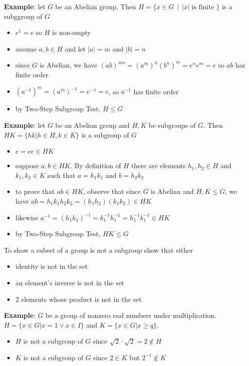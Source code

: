 \documentclass{article}
\begin{document}
  \textbf{Example}: let $G$ be an Abelian group. Then $H = \{x \in G \, \mid \, |x| \text{ is finite }\}$ is a subggroup of $G$
  \begin{itemize}
    \item $e^1 = e$ so $H$ is non-empty
    \item assume $a, b \in H$ and let $|a| = m$ and $|b| = n$
    \item since $G$ is Abelian, we have $(ab)^{mn} = (a^m)^n(b^n)^m = e^ne^m = e$ so $ab$ has finite order
    \item $(a^{-1})^m = (a^m)^{-1} = e^{-1} = e$, so $a^{-1}$ has finite order
    \item by Two-Step Subgroup Test, $H \leq G$
  \end{itemize}
  \textbf{Example}: let $G$ be an Abelian group and $H, K$ be subgroups of $G$. Then $HK = \{hk | h \in H, k \in K\}$ is a subgroup of $G$
  \begin{itemize}
    \item $e = ee \in HK$
    \item suppose $a, b \in HK$. By definition of $H$ there are elements $h_1, h_2 \in H$ and $k_1, k_2 \in K$ such that $a = h_1k_1$ and $b = h_2k_2$
    \item to prove that $ab \in HK$, observe that since $G$ is Abelian and $H, K \leq G$, we have $ab = h_1k_1h_2k_2 = (h_1h_2)(k_1k_2) \in HK$
    \item likewise $a^{-1} = (h_1k_1)^{-1} = k_1^{-1}h_1^{-1} = h_1^{-1}k_1^{-1} \in HK$
    \item by Two-Step Subgroup Test, $HK \leq G$
  \end{itemize}
  To show a subset of a group is not a subgroup show that either
  \begin{itemize}
    \item identity is not in the set
    \item an element's inverse is not in the set
    \item 2 elements whose product is not in the set
  \end{itemize}
  \textbf{Example}: $G$ be a group of nonzero real numbers under multiplication. $H = \{x \in G | x = 1 \vee x \in I\}$ and $K = \{x \in G | x \geq q\}$.
  \begin{itemize}
    \item $H$ is not a subgroup of $G$ since $\sqrt{2} \cdot \sqrt{2} = 2 \notin H$
    \item $K$ is not a subgroup of $G$ since $2 \in K$ but $2^{-1} \notin K$
  \end{itemize}
\end{document}
